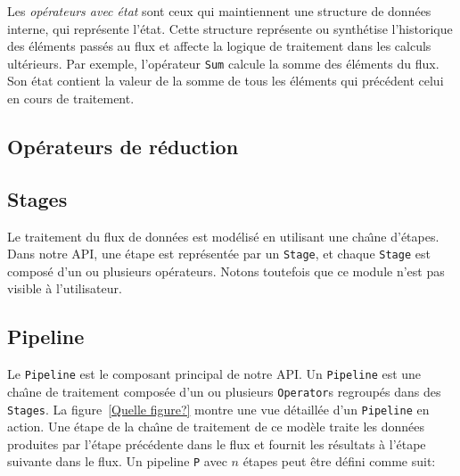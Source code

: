Les \emph{op\'erateurs avec \'etat} sont ceux qui maintiennent une structure de donn\'ees interne, qui repr\'esente l'\'etat. Cette structure repr\'esente ou synth\'etise l'historique des \'el\'ements pass\'es au flux et affecte la logique de traitement dans les calculs ult\'erieurs. Par exemple, l'op\'erateur \texttt{Sum} calcule la somme des \'el\'ements du flux. Son \'etat contient la valeur de la somme de tous les \'el\'ements qui pr\'ec\'edent celui en cours de traitement. 

\subsection*{Op\'erateurs de r\'eduction}

\label{reducer.sect}



\subsection{Stages}

Le traitement du flux de donn\'ees est mod\'elis\'e en utilisant une cha\^{\i}ne d'\'etapes. Dans notre API, une \'etape est repr\'esent\'ee par un \texttt{Stage}, et chaque \texttt{Stage} est compos\'e d'un ou plusieurs op\'erateurs. Notons toutefois que ce module n'est pas visible \`a l'utilisateur. 




\subsection{Pipeline}

Le \texttt{Pipeline} est le composant principal de notre API. Un \texttt{Pipeline} est une cha\^{\i}ne de traitement compos\'ee d'un ou plusieurs \texttt{Operator}s regroup\'es dans des \texttt{Stages}. La figure~\ref{Quelle figure?} montre une vue d\'etaill\'ee d'un \texttt{Pipeline} en action. Une \'etape de la cha\^{\i}ne de traitement de ce mod\`ele traite les donn\'ees produites par l'\'etape pr\'ec\'edente dans le flux et fournit les r\'esultats \`a l'étape suivante dans le flux. Un pipeline \texttt{P} avec $n$ \'etapes peut \^etre d\'efini comme suit:



